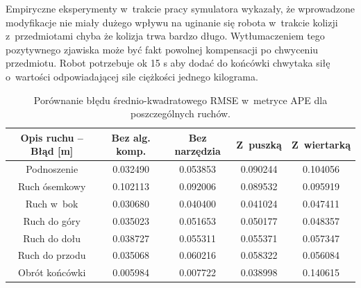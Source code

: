 Empiryczne eksperymenty w~trakcie pracy symulatora wykazały, że wprowadzone modyfikacje nie miały dużego wpływu na uginanie się robota w~trakcie kolizji z~przedmiotami chyba że kolizja trwa bardzo długo. Wytłumaczeniem tego pozytywnego zjawiska może być fakt powolnej kompensacji po chwyceniu przedmiotu. Robot potrzebuje ok 15 s aby dodać do końcówki chwytaka siłę o~wartości odpowiadającej sile ciężkości jednego kilograma. 

{\small
\begin{table}[H]

	\begin{tabular}{||c | c c c c ||}

		\hline

		Opis ruchu --  Błąd [m]  &  Bez alg. komp. & Bez narzędzia & Z~puszką  & Z~wiertarką  \\ [0.5ex]

		\hline\hline

		Podnoszenie & 0.032490 & 0.053853 & 0.090244 & 0.104056 \\
		Ruch ósemkowy &0.102113  & 0.092006 & 0.089532 & 0.095919 \\
		Ruch w~bok & 0.030680 & 0.040400 & 0.041024 &  0.047411\\
		Ruch do góry & 0.035023 & 0.051653 & 0.050177& 0.048357 \\
		Ruch do dołu & 0.038727 & 0.055311 & 0.055371 & 0.057347 \\
		Ruch do przodu & 0.035068 & 0.060216 & 0.058322 & 0.056084 \\
		Obrót końcówki & 0.005984 & 0.007722 & 0.038998 & 0.140615\\
		\hline

	\end{tabular}

	\caption{Porównanie błędu średnio-kwadratowego RMSE w~metryce APE dla poszczególnych ruchów.}

	\label{tab:}

\end{table}
}